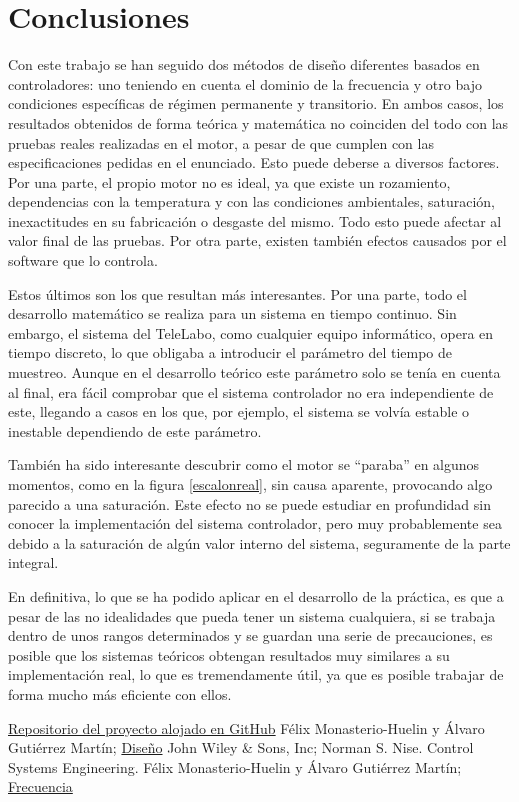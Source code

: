 \documentclass[a4paper]{article}
\begin{document}
\section{Conclusiones}

Con este trabajo se han seguido dos métodos de diseño diferentes basados en controladores: uno teniendo en cuenta el dominio de la frecuencia y otro bajo condiciones específicas de régimen permanente y transitorio.
En ambos casos, los resultados obtenidos de forma teórica y matemática no coinciden del todo con las pruebas reales realizadas en el motor, a pesar de que cumplen con las especificaciones pedidas en el enunciado.
Esto puede deberse a diversos factores. Por una parte, el propio motor no es ideal, ya que existe un rozamiento, dependencias con la temperatura y con las condiciones ambientales, saturación, inexactitudes en su fabricación o desgaste del mismo. Todo esto puede afectar al valor final de las pruebas.
Por otra parte, existen también efectos causados por el software que lo controla.

Estos últimos son los que resultan más interesantes. Por una parte, todo el desarrollo matemático se realiza para un sistema en tiempo continuo. Sin embargo, el sistema del TeleLabo, como cualquier equipo informático, opera en tiempo discreto, lo que obligaba a introducir el parámetro del tiempo de muestreo.
Aunque en el desarrollo teórico este parámetro solo se tenía en cuenta al final, era fácil comprobar que el sistema controlador no era independiente de este, llegando a casos en los que, por ejemplo, el sistema se volvía estable o inestable dependiendo de este parámetro.

También ha sido interesante descubrir como el motor se ``paraba'' en algunos momentos, como en la figura \ref{escalonreal}, sin causa aparente, provocando algo parecido a una saturación. Este efecto no se puede estudiar en profundidad sin conocer la implementación del sistema controlador, pero muy probablemente sea debido a la saturación de algún valor interno del sistema, seguramente de la parte integral.

En definitiva, lo que se ha podido aplicar en el desarrollo de la práctica, es que a pesar de las no idealidades que pueda tener un sistema cualquiera, si se trabaja dentro de unos rangos determinados y se guardan una serie de precauciones, es posible que los sistemas teóricos obtengan resultados muy similares a su implementación real, lo que es tremendamente útil, ya que es posible trabajar de forma mucho más eficiente con ellos.


\begin{thebibliography}{9}
 \href{https://github.com/avicarioe/telelabo}{Repositorio del proyecto alojado en GitHub}
 Félix Monasterio-Huelin y Álvaro Gutiérrez Martín;
\href{http://www.robolabo.etsit.upm.es/asignaturas/seco/apuntes/design.pdf}{Diseño}
 John Wiley \& Sons, Inc; Norman S. Nise. Control Systems Engineering.
 Félix Monasterio-Huelin y Álvaro Gutiérrez Martín;
\href{http://robolabo.etsit.upm.es/asignaturas/seco/apuntes/frecuencia.pdf} {Frecuencia}


\end{thebibliography}
\end{document}
